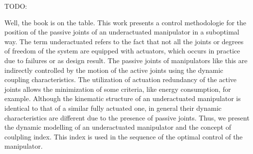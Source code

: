 TODO:

Well, the book is on the table. This work presents a control methodologie for the position of the  passive joints of an underactuated manipulator in a suboptimal way. The term underactuated refers to the fact that not all the joints or degrees of freedom of the system are equipped with actuators, which occurs in practice due to failures or as design result. The passive joints of manipulators like this are indirectly controlled by the motion of the active joints using the dynamic coupling characteristics. The utilization of actuation redundancy of the active joints allows the minimization of some criteria, like energy consumption, for example. Although the kinematic structure of an underactuated manipulator is identical to that of a similar fully actuated one, in general their dynamic characteristics are different due to the presence of passive joints. Thus, we present the dynamic modelling of an underactuated manipulator and the concept of coulpling index. This index is used in the sequence of the optimal control of the manipulator.

